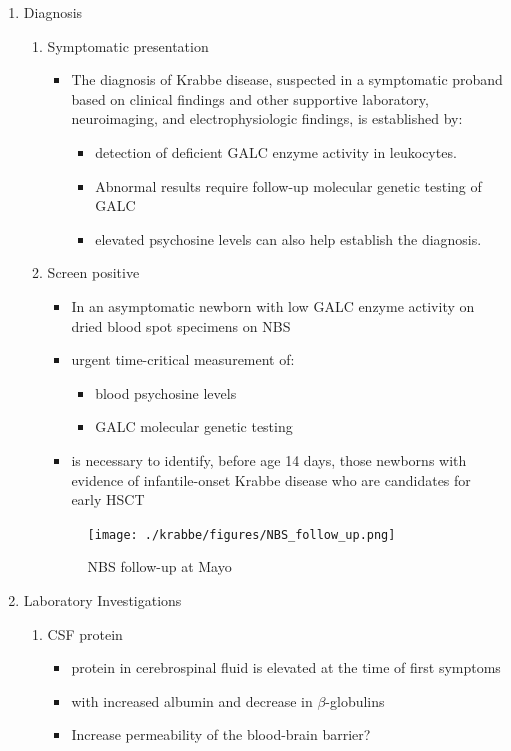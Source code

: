 \documentclass{scrartcl}
\begin{document}
\begin{enumerate}
\item Diagnosis
\label{sec:org28efd2e}
\begin{enumerate}
\item Symptomatic presentation
\label{sec:orgf619c3e}
\begin{itemize}
\item The diagnosis of Krabbe disease, suspected in a symptomatic proband
based on clinical findings and other supportive laboratory,
neuroimaging, and electrophysiologic findings, is established by:
\begin{itemize}
\item detection of deficient GALC enzyme activity in leukocytes.
\item Abnormal results require follow-up molecular genetic testing of GALC
\item elevated psychosine levels can also help establish the diagnosis.
\end{itemize}
\end{itemize}

\item Screen positive
\label{sec:org118929c}
\begin{itemize}
\item In an asymptomatic newborn with low GALC enzyme activity
on dried blood spot specimens on NBS
\item urgent time-critical measurement of:
\begin{itemize}
\item blood psychosine levels
\item GALC molecular genetic testing
\end{itemize}
\item is necessary to identify, before age 14 days, those newborns with
evidence of infantile-onset Krabbe disease who are candidates for
early HSCT
\end{itemize}

\begin{figure}[htbp]
\centering
\texttt{[image: ./krabbe/figures/NBS\_follow\_up.png]}
\caption{\label{fig:org6ed6d88}
NBS follow-up at Mayo}
\end{figure}
\end{enumerate}

\item Laboratory Investigations
\label{sec:org10fba50}

\begin{enumerate}
\item CSF protein
\label{sec:org5c19bba}
\begin{itemize}
\item protein in cerebrospinal fluid is elevated at the time of first symptoms
\item with increased albumin and decrease in \(\beta\)-globulins
\item Increase permeability of the blood-brain barrier?
\end{itemize}


\end{enumerate}
\end{enumerate}
\end{document}
